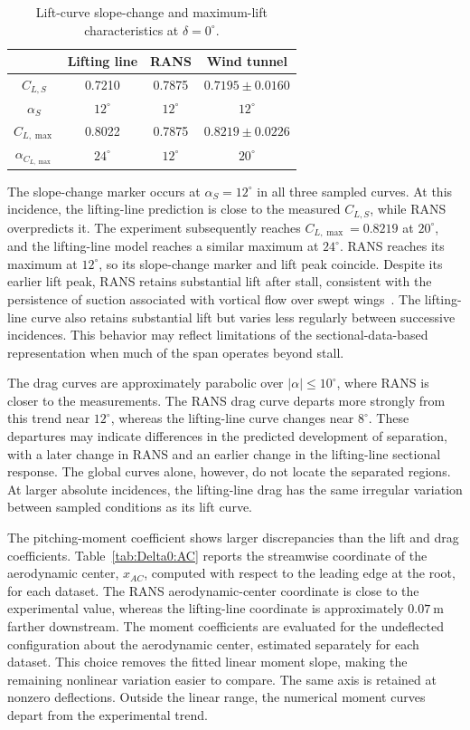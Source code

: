 \documentclass[journal ]{new-aiaa}
\begin{document}
\begin{table}[htbp]
\centering
\caption{Lift-curve slope-change and maximum-lift characteristics at $\delta=0^\circ$.}
\begin{tabular}{cccc}
\hline
\hline
& Lifting line & RANS & Wind tunnel \\
\hline
$C_{L,S}$ & 0.7210 & 0.7875 & $0.7195\pm0.0160$ \\
$\alpha_{S}$ & $12^\circ$ & $12^\circ$ & $12^\circ$ \\
$C_{L,\max}$ & 0.8022 & 0.7875 & $0.8219\pm0.0226$ \\
$\alpha_{C_{L,\max}}$ & $24^\circ$ & $12^\circ$ & $20^\circ$ \\
\hline
\hline
\end{tabular}
\label{tab:Delta0:AerodynChar}
\end{table}

The slope-change marker occurs at \(\alpha_S=12^\circ\) in all three sampled curves.
At this incidence, the lifting-line prediction is close to the measured \(C_{L,S}\), while RANS overpredicts it.
The experiment subsequently reaches \(C_{L,\max}=0.8219\) at \(20^\circ\), and the lifting-line model reaches a similar maximum at \(24^\circ\).
RANS reaches its maximum at \(12^\circ\), so its slope-change marker and lift peak coincide.
Despite its earlier lift peak, RANS retains substantial lift after stall, consistent with the persistence of suction associated with vortical flow over swept wings~\citep{harper1964sweptstall}.
The lifting-line curve also retains substantial lift but varies less regularly between successive incidences. This behavior may reflect limitations of the sectional-data-based representation when much of the span operates beyond stall.

The drag curves are approximately parabolic over \(\lvert\alpha\rvert\leq10^\circ\), where RANS is closer to the measurements.
The RANS drag curve departs more strongly from this trend near \(12^\circ\), whereas the lifting-line curve changes near \(8^\circ\).
These departures may indicate differences in the predicted development of separation, with a later change in RANS and an earlier change in the lifting-line sectional response. The global curves alone, however, do not locate the separated regions.
At larger absolute incidences, the lifting-line drag has the same irregular variation between sampled conditions as its lift curve.

The pitching-moment coefficient shows larger discrepancies than the lift and drag coefficients.
Table~\ref{tab:Delta0:AC} reports the streamwise coordinate of the aerodynamic center, $x_{AC}$, computed with respect to the leading edge at the root, for each dataset.
The RANS aerodynamic-center coordinate is close to the experimental value, whereas the lifting-line coordinate is approximately $0.07~\mathrm{m}$ farther downstream.
The moment coefficients are evaluated for the undeflected configuration about the aerodynamic center, estimated separately for each dataset.
This choice removes the fitted linear moment slope, making the remaining nonlinear variation easier to compare.
The same axis is retained at nonzero deflections. Outside the linear range, the numerical moment curves depart from the experimental trend.
\end{document}
